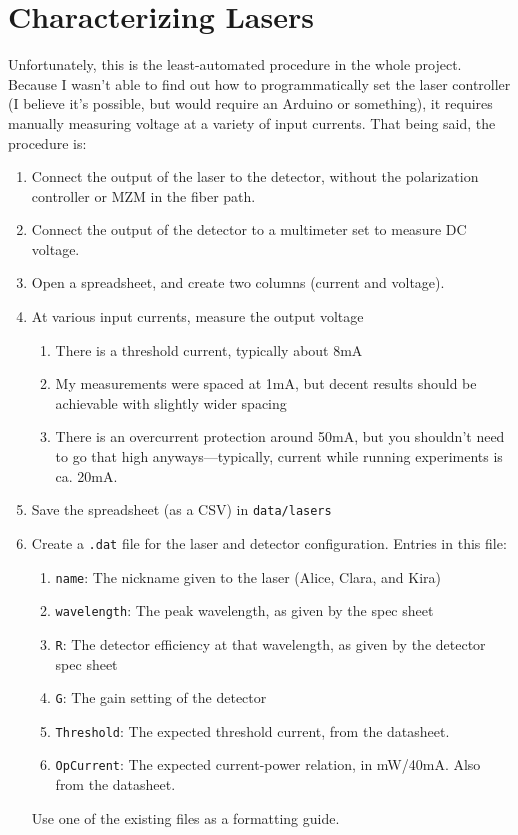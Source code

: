 \documentclass{article}
\newcommand{\code}{\texttt}
\begin{document}
    \section{Characterizing Lasers}
    Unfortunately, this is the least-automated procedure in the whole project. Because I wasn't able to find out how to programmatically set the laser controller (I believe it's possible, but would require an Arduino or something), it requires manually measuring voltage at a variety of input currents. That being said, the procedure is:
    \begin{enumerate}
        \item Connect the output of the laser to the detector, without the polarization controller or MZM in the fiber path.
        \item Connect the output of the detector to a multimeter set to measure DC voltage.
        \item Open a spreadsheet, and create two columns (current and voltage).
        \item At various input currents, measure the output voltage
        \begin{enumerate}
            \item There is a threshold current, typically about 8mA
            \item My measurements were spaced at 1mA, but decent results should be achievable with slightly wider spacing
            \item There is an overcurrent protection around 50mA, but you shouldn't need to go that high anyways---typically, current while running experiments is ca. 20mA.
        \end{enumerate}
        \item Save the spreadsheet (as a CSV) in \code{data/lasers}
        \item Create a \code{.dat} file for the laser and detector configuration. Entries in this file:
        \begin{enumerate}
            \item \code{name}: The nickname given to the laser (Alice, Clara, and Kira)
            \item \code{wavelength}: The peak wavelength, as given by the spec sheet
            \item \code{R}: The detector efficiency at that wavelength, as given by the detector spec sheet
            \item \code{G}: The gain setting of the detector
            \item \code{Threshold}: The expected threshold current, from the datasheet.
            \item \code{OpCurrent}: The expected current-power relation, in mW/40mA. Also from the datasheet.
        \end{enumerate}
        Use one of the existing files as a formatting guide.
    \end{enumerate}
\end{document}
